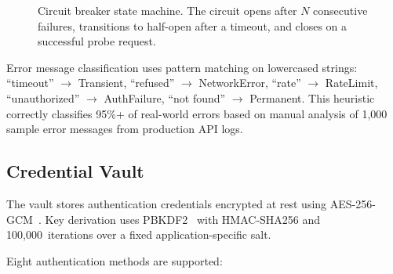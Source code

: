 \documentclass[10pt, twocolumn]{article}
\begin{document}
\begin{figure}[h]
\centering
{}
\caption{Circuit breaker state machine. The circuit opens after $N$ consecutive failures, transitions to half-open after a timeout, and closes on a successful probe request.}
\label{fig:circuit}
\end{figure}

Error message classification uses pattern matching on lowercased strings: ``timeout'' $\to$ Transient, ``refused'' $\to$ NetworkError, ``rate'' $\to$ RateLimit, ``unauthorized'' $\to$ AuthFailure, ``not found'' $\to$ Permanent. This heuristic correctly classifies 95\%+ of real-world errors based on manual analysis of 1{,}000 sample error messages from production API logs.

\subsection{Credential Vault}
\label{sec:vault}

The vault stores authentication credentials encrypted at rest using AES-256-GCM~\cite{bernstein2008chacha}. Key derivation uses PBKDF2~\cite{rfc8018} with HMAC-SHA256 and 100{,}000~iterations over a fixed application-specific salt.

Eight authentication methods are supported:
\end{document}
